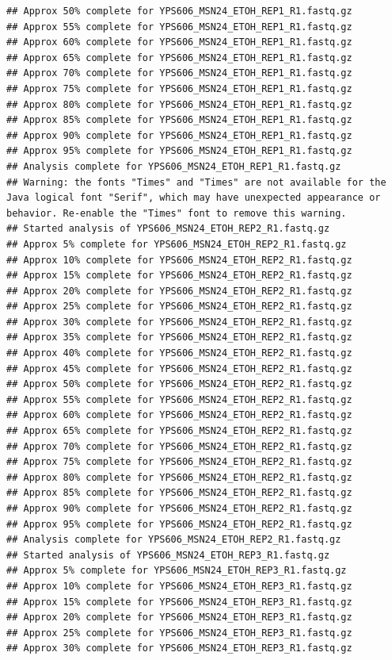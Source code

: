 \documentclass[
]{book}
\begin{document}
\begin{verbatim}
## Approx 50% complete for YPS606_MSN24_ETOH_REP1_R1.fastq.gz
## Approx 55% complete for YPS606_MSN24_ETOH_REP1_R1.fastq.gz
## Approx 60% complete for YPS606_MSN24_ETOH_REP1_R1.fastq.gz
## Approx 65% complete for YPS606_MSN24_ETOH_REP1_R1.fastq.gz
## Approx 70% complete for YPS606_MSN24_ETOH_REP1_R1.fastq.gz
## Approx 75% complete for YPS606_MSN24_ETOH_REP1_R1.fastq.gz
## Approx 80% complete for YPS606_MSN24_ETOH_REP1_R1.fastq.gz
## Approx 85% complete for YPS606_MSN24_ETOH_REP1_R1.fastq.gz
## Approx 90% complete for YPS606_MSN24_ETOH_REP1_R1.fastq.gz
## Approx 95% complete for YPS606_MSN24_ETOH_REP1_R1.fastq.gz
## Analysis complete for YPS606_MSN24_ETOH_REP1_R1.fastq.gz
## Warning: the fonts "Times" and "Times" are not available for the Java logical font "Serif", which may have unexpected appearance or behavior. Re-enable the "Times" font to remove this warning.
## Started analysis of YPS606_MSN24_ETOH_REP2_R1.fastq.gz
## Approx 5% complete for YPS606_MSN24_ETOH_REP2_R1.fastq.gz
## Approx 10% complete for YPS606_MSN24_ETOH_REP2_R1.fastq.gz
## Approx 15% complete for YPS606_MSN24_ETOH_REP2_R1.fastq.gz
## Approx 20% complete for YPS606_MSN24_ETOH_REP2_R1.fastq.gz
## Approx 25% complete for YPS606_MSN24_ETOH_REP2_R1.fastq.gz
## Approx 30% complete for YPS606_MSN24_ETOH_REP2_R1.fastq.gz
## Approx 35% complete for YPS606_MSN24_ETOH_REP2_R1.fastq.gz
## Approx 40% complete for YPS606_MSN24_ETOH_REP2_R1.fastq.gz
## Approx 45% complete for YPS606_MSN24_ETOH_REP2_R1.fastq.gz
## Approx 50% complete for YPS606_MSN24_ETOH_REP2_R1.fastq.gz
## Approx 55% complete for YPS606_MSN24_ETOH_REP2_R1.fastq.gz
## Approx 60% complete for YPS606_MSN24_ETOH_REP2_R1.fastq.gz
## Approx 65% complete for YPS606_MSN24_ETOH_REP2_R1.fastq.gz
## Approx 70% complete for YPS606_MSN24_ETOH_REP2_R1.fastq.gz
## Approx 75% complete for YPS606_MSN24_ETOH_REP2_R1.fastq.gz
## Approx 80% complete for YPS606_MSN24_ETOH_REP2_R1.fastq.gz
## Approx 85% complete for YPS606_MSN24_ETOH_REP2_R1.fastq.gz
## Approx 90% complete for YPS606_MSN24_ETOH_REP2_R1.fastq.gz
## Approx 95% complete for YPS606_MSN24_ETOH_REP2_R1.fastq.gz
## Analysis complete for YPS606_MSN24_ETOH_REP2_R1.fastq.gz
## Started analysis of YPS606_MSN24_ETOH_REP3_R1.fastq.gz
## Approx 5% complete for YPS606_MSN24_ETOH_REP3_R1.fastq.gz
## Approx 10% complete for YPS606_MSN24_ETOH_REP3_R1.fastq.gz
## Approx 15% complete for YPS606_MSN24_ETOH_REP3_R1.fastq.gz
## Approx 20% complete for YPS606_MSN24_ETOH_REP3_R1.fastq.gz
## Approx 25% complete for YPS606_MSN24_ETOH_REP3_R1.fastq.gz
## Approx 30% complete for YPS606_MSN24_ETOH_REP3_R1.fastq.gz

\end{verbatim}
\end{document}
